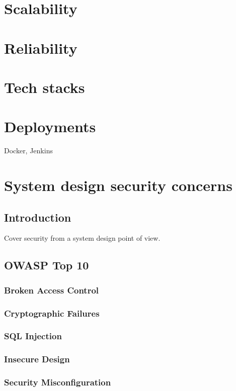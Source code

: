 \chapter{Scalability}

\chapter{Reliability}

\chapter{Tech stacks}

\chapter{Deployments}
Docker, Jenkins

\chapter{System design security concerns}

\section{Introduction}
Cover security from a system design point of view.

\section{OWASP Top 10}

\subsection{Broken Access Control}

\subsection{Cryptographic Failures}

\subsection{SQL Injection}

\subsection{Insecure Design}

\subsection{Security Misconfiguration}

